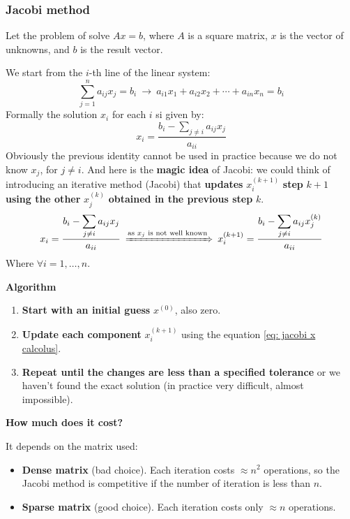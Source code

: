 \subsubsection{Jacobi method}

Let the problem of solve $Ax = b$, where $A$ is a square matrix, $x$ is the vector of unknowns, and $b$ is the result vector.

\highspace
We start from the $i$-th line of the linear system:
\begin{equation*}
    \displaystyle\sum_{j = 1}^{n} a_{ij}x_{j} = b_{i} \: \rightarrow \: a_{i1}x_{1} + a_{i2}x_{2} + \cdots + a_{in}x_{n} = b_{i}
\end{equation*}
Formally the solution $x_{i}$ for each $i$ si given by:
\begin{equation}
    x_{i} = \dfrac{b_{i}-\displaystyle\sum_{j \ne i} a_{ij}x_{j}}{a_{ii}}
\end{equation}
Obviously the previous identity cannot be used in practice because we do not know $x_{j}$, for $j \ne i$. And here is the \textbf{magic idea} of Jacobi: we could think of introducing an iterative method (Jacobi) that \textbf{updates} $x_{i}^{\left(k+1\right)}$ \textbf{step} $k+1$ \textbf{using the other} $x_{j}^{\left(k\right)}$ \textbf{obtained in the previous step} $k$.
\begin{equation}\label{eq: jacobi x calcolus}
    x_{i} = \dfrac{b_{i}-\displaystyle\sum_{j \ne i} a_{ij}x_{j}}{a_{ii}} \: \xRightarrow{\text{as }x_{j}\text{ is not well known}} \: x_{i}^{\left(k+1\right)} = \dfrac{b_{i}-\displaystyle\sum_{j \ne i} a_{ij}x_{j}^{\left(k\right)}}{a_{ii}}
\end{equation}
Where $\forall i = 1, \dots, n$.

\highspace
\begin{flushleft}
    \textcolor{Green3}{ \textbf{Algorithm}}
\end{flushleft}
\begin{enumerate}
    \item \textbf{Start with an initial guess} $x^{\left(0\right)}$, also zero.
    \item \textbf{Update each component} $x_{i}^{\left(k+1\right)}$ using the equation \ref{eq: jacobi x calcolus}.
    \item \textbf{Repeat until the changes are less than a specified tolerance} or we haven't found the exact solution (in practice very difficult, almost impossible).
\end{enumerate}

\highspace
\begin{flushleft}
    \textcolor{Red2}{ \textbf{How much does it cost?}}
    \label{general-ref: cost jacobi method}
\end{flushleft}
It depends on the matrix used:
\begin{itemize}
    \item \textbf{Dense matrix} (bad choice). Each iteration costs $\approx n^{2}$ operations, so the Jacobi method is competitive if the number of iteration is less than $n$.
    \item \textbf{Sparse matrix} (good choice). Each iteration costs only $\approx n$ operations.
\end{itemize}

